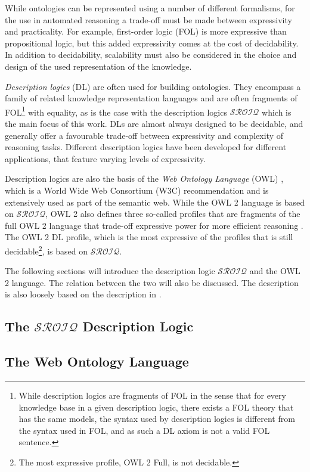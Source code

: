 
While ontologies can be represented using a number of different formalisms, for the use in automated reasoning a trade-off must be made between expressivity and practicality. For example, first-order logic (FOL) is more expressive than propositional logic, but this added expressivity comes at the cost of decidability. In addition to decidability, scalability must also be considered in the choice and design of the used representation of the knowledge.

\emph{Description logics} (DL) are often used for building ontologies. They encompass a family of related knowledge representation languages and are often fragments of FOL\footnote{While description logics are fragments of FOL in the sense that for every knowledge base in a given description logic, there exists a FOL theory that has the same models, the syntax used by description logics is different from the syntax used in FOL, and as such a DL axiom is not a valid FOL sentence.} with equality, as is the case with the description logics $\mathcal{SROIQ}$ which is the main focus of this work. DLs are almost always designed to be decidable, and generally offer a favourable trade-off between expressivity and complexity of reasoning tasks. Different description logics have been developed for different applications, that feature varying levels of expressivity.

Description logics are also the basis of the \emph{Web Ontology Language} (OWL) \cite{hitzler2009owl_primer,motik2009owl_spec}, which is a World Wide Web Consortium (W3C) recommendation and is extensively used as part of the semantic web. While the OWL 2 language is based on $\mathcal{SROIQ}$, OWL 2 also defines three so-called profiles that are fragments of the full OWL 2 language that trade-off expressive power for more efficient reasoning \cite{motik2009owl_profiles,motik2009owl_spec}. The OWL 2 DL profile, which is the most expressive of the profiles that is still decidable\footnote{The most expressive profile, OWL 2 Full, is not decidable.}, is based on $\mathcal{SROIQ}$.

The following sections will introduce the description logic $\mathcal{SROIQ}$ and the OWL 2 language. The relation between the two will also be discussed. The description is also loosely based on the description in \cite{rudolph2011foundations}.

\subsection{The \texorpdfstring{$\mathcal{SROIQ}$}{SROIQ} Description Logic} \label{sroiq-def}



\subsection{The Web Ontology Language} \label{owl-def}



